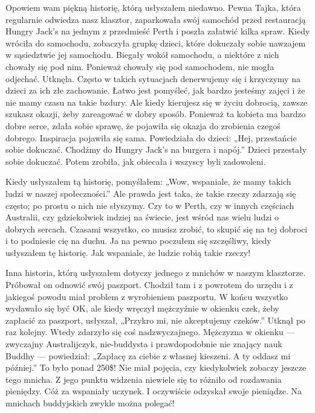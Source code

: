 \documentclass[12pt,openany]{book}
\begin{document}
Opowiem wam piękną historię, którą usłyszałem niedawno. Pewna Tajka, która regularnie odwiedza nasz klasztor, zaparkowała swój samochód przed restauracją Hungry Jack’s na jednym z przedmieść Perth i poszła załatwić kilka spraw. Kiedy wróciła do samochodu, zobaczyła grupkę dzieci, które dokuczały sobie nawzajem w sąsiedztwie jej samochodu. Biegały wokół samochodu, a niektóre z nich chowały się pod nim. Ponieważ chowały się pod samochodem, nie mogła odjechać. Utknęła. Często w takich sytuacjach denerwujemy się i krzyczymy na dzieci za ich złe zachowanie. Łatwo jest pomyśleć, jak bardzo jesteśmy zajęci i że nie mamy czasu na takie bzdury. Ale kiedy kierujesz się w życiu dobrocią, zawsze szukasz okazji, żeby zareagować w dobry sposób. Ponieważ ta kobieta ma bardzo dobre serce, zdała sobie sprawę, że pojawiła się okazja do zrobienia czegoś dobrego. Inspiracja pojawiła się sama. Powiedziała do dzieci: „Hej, przestańcie sobie dokuczać. Chodźmy do Hungry Jack’s na burgera i napój.” Dzieci przestały sobie dokuczać. Potem zrobiła, jak obiecała i wszyscy byli zadowoleni.

Kiedy usłyszałem tą historię, pomyślałem: „Wow, wspaniale, że mamy takich ludzi w naszej społeczności.” Ale prawda jest taka, że takie rzeczy zdarzają się często; po prostu o nich nie słyszymy. Czy to w Perth, czy w innych częściach Australii, czy gdziekolwiek indziej na świecie, jest wśród nas wielu ludzi o dobrych sercach. Czasami wszystko, co musisz zrobić, to skupić się na tej dobroci i to podniesie cię na duchu. Ja na pewno poczułem się szczęśliwy, kiedy usłyszałem tę historię. Jak wspaniale, że ludzie robią takie rzeczy!

Inna historia, którą usłyszałem dotyczy jednego z mnichów w naszym klasztorze. Próbował on odnowić swój paszport. Chodził tam i z powrotem do urzędu i z jakiegoś powodu miał problem z wyrobieniem paszportu. W końcu wszystko wydawało się być OK, ale kiedy wręczył mężczyźnie w okienku czek, żeby zapłacić za paszport, usłyszał, „Przykro mi, nie akceptujemy czeków.” Utknął po raz kolejny. Wtedy zdarzyło się coś nadzwyczajnego. Mężczyzna w okienku --- zwyczajny Australijczyk, nie-buddysta i prawdopodobnie nie znający nauk Buddhy --- powiedział: „Zapłacę za ciebie z własnej kieszeni. A ty oddasz mi później.” To było ponad 250\$! Nie miał pojęcia, czy kiedykolwiek zobaczy jeszcze tego mnicha. Z jego punktu widzenia niewiele się to różniło od rozdawania pieniędzy. Cóż za wspaniały uczynek. I oczywiście odzyskał swoje pieniądze. Na mnichach buddyjskich zwykle można polegać!
\end{document}
